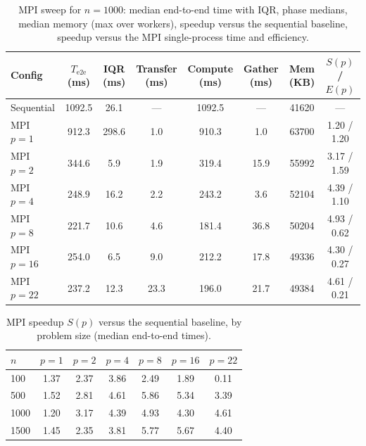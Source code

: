 \documentclass[12pt,a4paper]{article}
\begin{document}
\begin{table}[h]
\centering
\caption{MPI sweep for $n = 1000$: median end-to-end time with IQR, phase
medians, median memory (max over workers), speedup versus the sequential
baseline, speedup versus the MPI single-process time and efficiency.}
\label{tab:mpi-sweep}
\begin{tabular}{@{}lccccccc@{}}
\toprule
Config & $T_{\mathrm{e2e}}$ (ms) & IQR (ms) & Transfer (ms) & Compute (ms) & Gather (ms) & Mem (KB) & $S(p)$ / $E(p)$ \\
\midrule
Sequential & 1092.5 & 26.1 & --- & 1092.5 & --- & 41620 & --- \\
MPI $p=1$ & 912.3 & 298.6 & 1.0 & 910.3 & 1.0 & 63700 & 1.20 / 1.20 \\
MPI $p=2$ & 344.6 & 5.9 & 1.9 & 319.4 & 15.9 & 55992 & 3.17 / 1.59 \\
MPI $p=4$ & 248.9 & 16.2 & 2.2 & 243.2 & 3.6 & 52104 & 4.39 / 1.10 \\
MPI $p=8$ & 221.7 & 10.6 & 4.6 & 181.4 & 36.8 & 50204 & 4.93 / 0.62 \\
MPI $p=16$ & 254.0 & 6.5 & 9.0 & 212.2 & 17.8 & 49336 & 4.30 / 0.27 \\
MPI $p=22$ & 237.2 & 12.3 & 23.3 & 196.0 & 21.7 & 49384 & 4.61 / 0.21 \\
\bottomrule
\end{tabular}
\end{table}

\begin{table}[h]
\centering
\caption{MPI speedup $S(p)$ versus the sequential baseline, by problem size
(median end-to-end times).}
\label{tab:cross}
\begin{tabular}{@{}lcccccc@{}}
\toprule
$n$ & $p=1$ & $p=2$ & $p=4$ & $p=8$ & $p=16$ & $p=22$ \\
\midrule
100 & 1.37 & 2.37 & 3.86 & 2.49 & 1.89 & 0.11 \\
500 & 1.52 & 2.81 & 4.61 & 5.86 & 5.34 & 3.39 \\
1000 & 1.20 & 3.17 & 4.39 & 4.93 & 4.30 & 4.61 \\
1500 & 1.45 & 2.35 & 3.81 & 5.77 & 5.67 & 4.40 \\
\bottomrule
\end{tabular}
\end{table}
\end{document}
